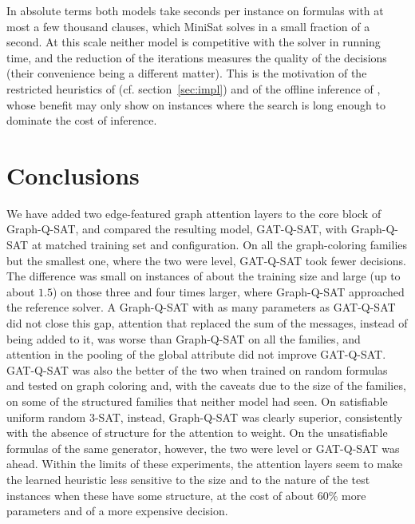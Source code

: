 \documentclass[11pt,a4paper]{article}
\begin{document}
\smallskip
\noindent
In absolute terms both models take seconds per instance on formulas with at
most a few thousand clauses, which MiniSat solves in a small fraction of a
second. At this scale neither model is competitive with the solver in running
time, and the reduction of the iterations measures the quality of the decisions
(their convenience being a different matter). This is the motivation of the restricted heuristics
of \cite{Shirokikh2023} (cf. section~\ref{sec:impl}) and of the offline
inference of \cite{Wang2024}, whose benefit may only show on instances where the
search is long enough to dominate the cost of inference.

\section{Conclusions}\label{sec:conc}

We have added two edge-featured graph attention layers to the core block of
Graph-Q-SAT, and compared the resulting model, GAT-Q-SAT, with Graph-Q-SAT at
matched training set and configuration. On all the graph-coloring families but
the smallest one, where the two were level, GAT-Q-SAT took fewer decisions. The
difference was small on instances of about the training size and large (up to
about $1.5$) on those three and four times larger, where Graph-Q-SAT approached
the reference solver. A Graph-Q-SAT with as many parameters as GAT-Q-SAT did
not close this gap, attention that replaced the sum of the messages, instead of
being added to it, was worse than Graph-Q-SAT on all the families, and
attention in the pooling of the global attribute did not improve GAT-Q-SAT. GAT-Q-SAT was also the better of the two when
trained on random formulas and tested on graph coloring and, with the caveats
due to the size of the families, on some of the structured families that
neither model had seen. On satisfiable uniform random 3-SAT, instead,
Graph-Q-SAT was clearly superior, consistently with the absence of structure
for the attention to weight. On the unsatisfiable formulas of the same
generator, however, the two were level or GAT-Q-SAT was ahead. Within the limits of these experiments, the attention layers
seem to make the learned heuristic less sensitive to the size and to the nature
of the test instances when these have some structure, at the cost of about 60\%
more parameters and of a more expensive decision.
\end{document}
